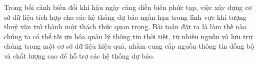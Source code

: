 
Trong bối cảnh biến đổi khí hậu ngày càng diễn biến phức tạp, việc xây dựng cơ sở dữ liệu tích hợp cho các hệ thống dự báo ngắn hạn trong lĩnh vực khí tượng thuỷ văn trở thành một thách thức quan trọng. Bài toán đặt ra là làm thế nào chúng ta có thể tối ưu hóa quản lý thông tin thời tiết, từ nhiều nguồn và lưu trữ chúng trong một cơ sở dữ liệu hiệu quả, nhằm cung cấp nguồn thông tin đồng bộ và chất lượng cao để hỗ trợ các hệ thống dự báo.